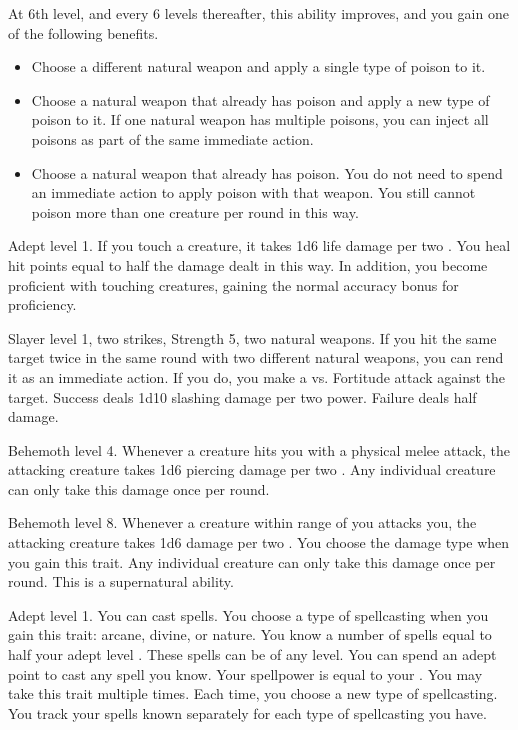     At 6th level, and every 6 levels thereafter, this ability improves, and you gain one of the following benefits.
    \begin{itemize}
        \item Choose a different natural weapon and apply a single type of poison to it.
        \item Choose a natural weapon that already has poison and apply a new type of poison to it.
            If one natural weapon has multiple poisons, you can inject all poisons as part of the same immediate action.
        \item Choose a natural weapon that already has poison.
            You do not need to spend an immediate action to apply poison with that weapon.
            You still cannot poison more than one creature per round in this way.
    \end{itemize}

    \featpre Adept level 1.
    \featben If you touch a creature, it takes 1d6 life damage  per two .
    You heal hit points equal to half the damage dealt in this way.
    In addition, you become proficient with touching creatures, gaining the normal  accuracy bonus for proficiency.

    \featpres Slayer level 1, two strikes, Strength 5, two natural weapons.
    \featben If you hit the same target twice in the same round with two different natural weapons, you can rend it as an immediate action.
    If you do, you make a  vs. Fortitude attack against the target.
    Success deals 1d10 slashing damage per two power.
    Failure deals half damage.

    \featpre Behemoth level 4.
    \featben Whenever a creature hits you with a physical melee attack, the attacking creature takes 1d6 piercing damage per two .
    Any individual creature can only take this damage once per round.

    \featpre Behemoth level 8.
    \featben Whenever a creature within \rngmed range of you attacks you, the attacking creature takes 1d6 damage per two .
    You choose the damage type when you gain this trait.
    Any individual creature can only take this damage once per round.
    This is a supernatural ability.

    \featpre Adept level 1.
    \featben You can cast spells.
    You choose a type of spellcasting when you gain this trait: arcane, divine, or nature.
    You know a number of spells equal to half your adept level .
    These spells can be of any level.
    You can spend an adept point to cast any spell you know.
    Your spellpower is equal to your .
     You may take this trait multiple times.
    Each time, you choose a new type of spellcasting.
    You track your spells known separately for each type of spellcasting you have.

